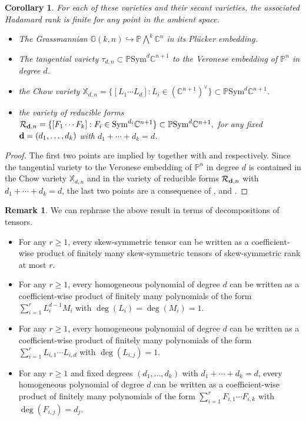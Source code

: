 \documentclass{amsart}
\theoremstyle{plain}
\numberwithin{theorem}{section}
\newtheorem{corollary}[theorem]{Corollary}
\theoremstyle{definition}
\newtheorem{remark}[theorem]{Remark}
\newcommand{\bbC}{\mathbb{C}}
\newcommand{\bbG}{\mathbb{G}}
\newcommand{\bbP}{\mathbb{P}}
\newcommand{\Sym}{\mathrm{Sym}}
\begin{document}
\begin{corollary}
    For each of these varieties and their secant varieties, the associated Hadamard rank is finite for any point in the ambient space.
    \begin{itemize}
        \item The Grassmannian  $\bbG(k,n) \hookrightarrow \bbP \bigwedge^{k} \bbC^{n}$ in its Plücker embedding.
        \item The tangential variety $\tau_{d,n} \subset \bbP \Sym^d\bbC^{n+1}$ to the Veronese embedding of $\bbP^n$ in degree $d$.
        \item the Chow variety
        $
            \mathbb{X}_{d,n} = \{ [L_1 \cdots L_d] : L_i \in (\bbC^{n+1})^\vee \} \subset \bbP \Sym^d\bbC^{n+1}.
        $
        \item the variety of reducible forms
        $
            \mathcal{R}_{{\bf d},n} = \{ [F_1 \cdots F_k] : F_i \in \Sym^{d_i} \bbC^{n+1}\} \subset \bbP \Sym^{d} \bbC^{n+1},
        $
        for any fixed ${\bf d} = (d_1,\ldots,d_k)$ with $d_1 + \cdots + d_k = d$.
    \end{itemize}
\end{corollary}
\begin{proof}
    The first two points are implied by  together with  and  respectively. Since the tangential variety to the Veronese embedding of $\bbP^n$ in degree $d$ is contained in the Chow variety $\mathbb{X}_{d,n}$ and in the variety of reducible forms $\mathcal{R}_{{\bf d},n}$ with $d_1 + \cdots + d_k = d$, the last two points are a consequence of ,  and  .
\end{proof}

\begin{remark}
    We can rephrase the above result in terms of decompositions of tensors.
    \begin{itemize}
        \item For any $r \geq 1$, every skew-symmetric tensor can be written as a coefficient-wise product of finitely many skew-symmetric tensors of skew-symmetric rank at most $r$.
        \item For any $r \geq 1$, every homogeneous polynomial of degree $d$ can be written as a coefficient-wise product of finitely many polynomials of the form $\sum_{i=1}^r L_i^{d-1}M_i$ with $\deg(L_i) = \deg(M_i) = 1$.
        \item For any $r \geq 1$, every homogeneous polynomial of degree $d$ can be written as a coefficient-wise product of finitely many polynomials of the form $\sum_{i=1}^r L_{i,1}\cdots L_{i,d}$ with $\deg(L_{i,j}) = 1$.
        \item For any $r \geq 1$ and fixed degrees $(d_1,\ldots,d_k)$ with $d_1 + \cdots + d_k = d$, every homogeneous polynomial of degree $d$ can be written as a coefficient-wise product of finitely many polynomials of the form $\sum_{i=1}^r F_{i,1}\cdots F_{i,k}$ with $\deg(F_{i,j}) = d_j$.
    \end{itemize}
\end{remark}
\end{document}
